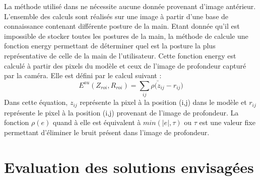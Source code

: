 La méthode utilisé dans \cite{export:238453} ne nécessite aucune donnée provenant d'image antérieur. L'ensemble
des calculs sont réalisés sur une image à partir d'une base de connaissance contenant différente posture de la
main. Etant donnée qu'il est impossible de stocker toutes les postures de la main, la méthode de \cite{export:238453}
calcule une fonction energy permettant de déterminer quel est la posture la plus représentative de celle de la main
de l'utilisateur. Cette fonction energy est calculé à partir des pixels du modèle et ceux de l'image de profondeur
capturé par la caméra. Elle est défini par le calcul suivant :
\begin{equation}
 E^{au}(Z_{roi}, R_{roi}) = \sum_{ij} \bar{\rho(z_{ij}} - r_{ij})
\end{equation}
Dans cette équation, $z_{ij}$ représente la pixel à la position (i,j) dans le modèle et $r_{ij}$ représente le pixel à la position (i,j)
provenant de l'image de profondeur. La fonction $\rho(e)$ quand à elle est équivalent à $min(|e|,\tau)$ ou $\tau$ est une valeur fixe permettant
d'éliminer le bruit présent dans l'image de profondeur.

\section{Evaluation des solutions envisagées}
